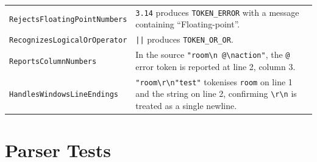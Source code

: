 \documentclass[12pt, a4paper]{article}
\begin{document}
\begin{longtable}{p{6.5cm} p{7cm}}
\texttt{RejectsFloatingPointNumbers} &
  \texttt{3.14} produces \texttt{TOKEN\_ERROR} with a message containing
  ``Floating-point''. \\[4pt]

\texttt{RecognizesLogicalOrOperator} &
  \texttt{||} produces \texttt{TOKEN\_OR\_OR}. \\[4pt]

\texttt{ReportsColumnNumbers} &
  In the source \texttt{"room\textbackslash n  @\textbackslash naction"}, the
  \texttt{@} error token is reported at line 2, column 3. \\[4pt]

\texttt{HandlesWindowsLineEndings} &
  \texttt{"room\textbackslash r\textbackslash n"test"} tokenises \texttt{room} on
  line 1 and the string on line 2, confirming \texttt{\textbackslash r\textbackslash n}
  is treated as a single newline. \\
\bottomrule
\end{longtable}

\section{Parser Tests}
\end{document}
